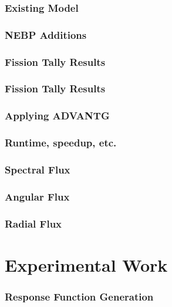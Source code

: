 \documentclass[fleqn]{beamer}
\begin{document}
\begin{frame}
\frametitle{Existing Model}

\end{frame}

\begin{frame}
\frametitle{NEBP Additions}

\end{frame}

\begin{frame}
\frametitle{Fission Tally Results}

\end{frame}

\begin{frame}
\frametitle{Fission Tally Results}

\end{frame}

\begin{frame}
\frametitle{Applying ADVANTG}

\end{frame}

\begin{frame}
\frametitle{Runtime, speedup, etc.}

\end{frame}

\begin{frame}
\frametitle{Spectral Flux}

\end{frame}

\begin{frame}
\frametitle{Angular Flux}

\end{frame}

\begin{frame}
\frametitle{Radial Flux}

\end{frame}

\section{Experimental Work}
\begin{frame}
\frametitle{Response Function Generation}

\end{frame}
\end{document}
